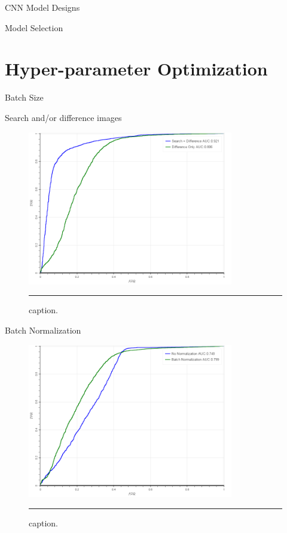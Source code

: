 CNN Model Designs

Model Selection

\section{Hyper-parameter Optimization}

  Batch Size

  Search and/or difference images
  
\begin{figure}[htbp]
  \centering
    \includegraphics[width = 0.8\textwidth]{./Figures/AUC_search_mse.png}
    \rule{35em}{0.5pt}
  \caption[Search and/or Difference Images]{caption.}
  \label{fig:}
\end{figure}


  Batch Normalization
  
\begin{figure}[htbp]
  \centering
    \includegraphics[width = 0.8\textwidth]{./Figures/AUC_batchnorm.png}
    \rule{35em}{0.5pt}
  \caption[Batch Normalization]{caption.}
  \label{fig:}
\end{figure}


